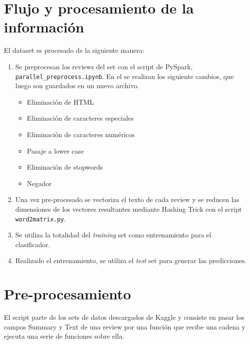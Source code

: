 \documentclass[10pt,a4paper]{article}
\begin{document}
\section{Flujo y procesamiento de la información}
El dataset es procesado de la siguiente manera:

\begin{enumerate}
    \item Se preprocesan los reviews del set con el script de PySpark, \texttt{parallel\_preprocess.ipynb}. En el se realizan los siguiente cambios, que luego son guardados en un nuevo archivo. 
        \begin{itemize}
            \item Eliminación de HTML
            \item Eliminación de caracteres especiales
            \item Eliminación de caracteres numéricos
            \item Pasaje a lower case
            \item Eliminación de stopwords
            \item Negador
        \end{itemize}
    
    \item Una vez pre-procesado se vectoriza el texto de cada review y se reducen las dimensiones de los vectores resultantes mediante Hashing Trick con el script \texttt{word2matrix.py}.
    \item Se utiliza la totalidad del \textit{training} set como entrenamiento para el clasificador.
    \item Realizado el entrenamiento, se utiliza el \textit{test} set para generar las predicciones.
\end{enumerate}


\section{Pre-procesamiento}
El script parte de los sets de datos descargados de Kaggle y consiste en pasar los campos Summary y Text de una review por una función que recibe una cadena y ejecuta una serie de funciones sobre ella.
\end{document}

